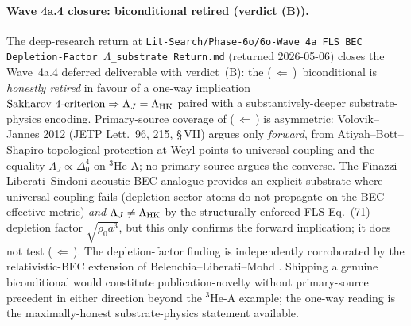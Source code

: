 \documentclass[aps,prd,reprint,nofootinbib,superscriptaddress]{revtex4-2}
\begin{document}
\paragraph{Wave 4a.4 closure: biconditional retired (verdict (B)).}
The deep-research return at
\texttt{Lit-Search/Phase-6o/6o-Wave 4a FLS BEC Depletion-Factor
$\Lambda$\_substrate Return.md} (returned 2026-05-06) closes the
Wave~4a.4 deferred deliverable with verdict~(B): the
(\,$\Leftarrow$\,)~biconditional is \emph{honestly retired} in favour
of a one-way implication $\text{Sakharov 4-criterion} \Rightarrow
\Lambda_J = \Lambda_{\rm HK}$ paired with a substantively-deeper
substrate-physics encoding. Primary-source coverage of (\,$\Leftarrow$\,)
is asymmetric: Volovik--Jannes 2012 \cite{JannesVolovik2012} (JETP
Lett.\ 96, 215, \S\,VII) argues only \emph{forward}, from Atiyah--Bott--
Shapiro topological protection at Weyl points to universal coupling
and the equality $\Lambda_J \propto \Delta_0^4$ on $^3\!\text{He-A}$;
no primary source argues the converse. The Finazzi--Liberati--Sindoni
acoustic-BEC analogue \cite{FinazziLiberatiSindoni2012PRL,
FinazziLiberatiSindoni2012Proc} provides an explicit substrate where
universal coupling fails (depletion-sector atoms do not propagate on
the BEC effective metric) \emph{and} $\Lambda_J \neq \Lambda_{\rm HK}$
by the structurally enforced FLS Eq.~(71) depletion factor
$\sqrt{\rho_0 a^3}$, but this only confirms the forward implication; it
does not test (\,$\Leftarrow$\,). The depletion-factor finding is
independently corroborated by the relativistic-BEC extension of
Belenchia--Liberati--Mohd \cite{BelenchiaLiberatiMohd2014}. Shipping a
genuine biconditional would constitute publication-novelty without
primary-source precedent in either direction beyond the
$^3\!\text{He-A}$ example; the one-way reading is the
maximally-honest substrate-physics statement available.
\end{document}
